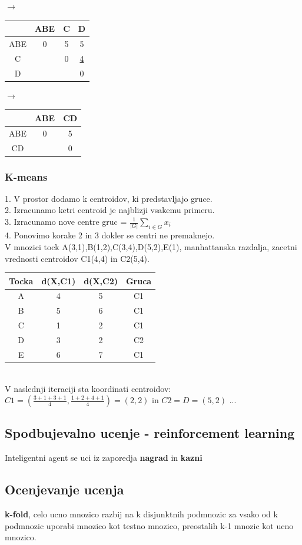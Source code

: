 $\rightarrow$
\begin{tabular}{c|ccc}
    & ABE & C & D\\
    \hline
    ABE & 0 & 5 & 5\\
    C &   & 0 & \underline{4}\\
    D &   &   & 0\\
\end{tabular}
$\rightarrow$
\begin{tabular}{c|cc}
    & ABE & CD\\
    \hline
    ABE & 0 & 5\\
    CD &   & 0\\
\end{tabular}


    

\subsubsection{K-means}
1. V prostor dodamo k centroidov, ki predstavljajo gruce.\\
2. Izracunamo ketri centroid je najblizji vsakemu primeru.\\
3. Izracunamo nove centre gruc = $\frac{1}{|G|}\sum\limits_{i\in G} x_i$\\
4. Ponovimo korake 2 in 3 dokler se centri ne premaknejo.\\
V mnozici tock A(3,1),B(1,2),C(3,4),D(5,2),E(1), manhattanska razdalja, zacetni vrednosti centroidov C1(4,4) in C2(5,4).\\
\begin{tabular}{c|c|c|c}
    Tocka & d(X,C1) & d(X,C2) & Gruca\\
    \hline
    A & 4 & 5 & C1\\ 
    B & 5 & 6 & C1\\
    C & 1 & 2 & C1\\
    D & 3 & 2 & C2\\
    E & 6 & 7 & C1\\
    \hline
\end{tabular}\\
V naslednji iteraciji sta koordinati centroidov:\\
$C1=(\frac{3+1+3+1}{4},\frac{1+2+4+1}{4})=(2,2)$ \; in \; $C2=D=(5,2)$ ...

\subsection{Spodbujevalno ucenje - reinforcement learning}
Inteligentni agent se uci iz zaporedja \textbf{nagrad} in \textbf{kazni}

\subsection{Ocenjevanje ucenja}
\textbf{k-fold}, celo ucno mnozico razbij na k disjunktnih podmnozic za vsako od k podmnozic uporabi mnozico kot testno mnozico, preostalih k-1 mnozic kot ucno mnozico.